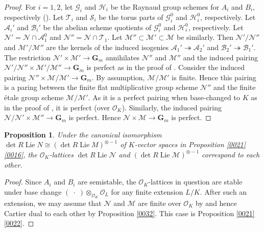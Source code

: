 \documentclass{amsart}
\newtheorem{proposition}[theorem]{Proposition}
\theoremstyle{remark}
\numberwithin{equation}{section}
\newcommand{\Order}{\mathcal{O}}
\newcommand{\onto}{\twoheadrightarrow}
\newcommand{\tensor}{\mathbin{\otimes}}
\newcommand{\Gm}{\mathbf{G}_{m}}
\newcommand{\var}{\;\cdot\;}
\DeclareMathOperator{\Lie}{Lie}
\begin{document}
\begin{proof}
	For $i = 1, 2$,
	let $\mathcal{G}_{i}$ and $\mathcal{H}_{i}$ be
	the Raynaud group schemes for $A_{i}$ and $B_{i}$, respectively
	(\cite[Chapter III, Theorem C.15]{Mil06}).
	Let $\mathcal{T}_{i}$ and $\mathcal{S}_{i}$ be
	the torus parts of
	$\mathcal{G}_{i}^{0}$ and $\mathcal{H}_{i}^{0}$, respectively.
	Let $\mathcal{A}_{i}'$ and $\mathcal{B}_{i}'$ be
	the abelian scheme quotients of
	$\mathcal{G}_{i}^{0}$ and $\mathcal{H}_{i}^{0}$, respectively.
	Let $\mathcal{N}' =  \mathcal{N} \cap \mathcal{A}_{1}^{0}$ and
	$\mathcal{N}'' = \mathcal{N} \cap \mathcal{T}_{1}$.
	Let $\mathcal{M}'' \subset \mathcal{M}' \subset \mathcal{M}$ be similarly.
	Then $\mathcal{N}' / \mathcal{N}''$ and $\mathcal{M}' / \mathcal{M}''$
	are the kernels of the induced isogenies
	$\mathcal{A}_{1}' \onto \mathcal{A}_{2}'$
	and $\mathcal{B}_{2}' \onto \mathcal{B}_{1}'$.
	The restriction $\mathcal{N}' \times \mathcal{M}' \to \Gm$
	annihilates $\mathcal{N}''$ and $\mathcal{M}''$
	and the induced pairing
	$\mathcal{N}' / \mathcal{N}'' \times \mathcal{M}' / \mathcal{M}'' \to \Gm$
	is perfect as in the proof of \cite[Chapter III, Theorem C.15 (d)]{Mil06}.
	Consider the induced pairing
	$\mathcal{N}'' \times \mathcal{M} / \mathcal{M}' \to \Gm$.
	By assumption, $\mathcal{M} / \mathcal{M}'$ is finite.
	Hence this pairing is a paring between
	the finite flat multiplicative group scheme $\mathcal{N}''$
	and the finite \'etale group scheme $\mathcal{M} / \mathcal{M}'$.
	As it is a perfect pairing when base-changed to $K$
	as in the proof of \cite[Chapter III, Theorem C.15 (d)]{Mil06},
	it is perfect (over $\Order_{K}$).
	Similarly, the induced pairing
	$\mathcal{N} / \mathcal{N}' \times \mathcal{M}'' \to \Gm$
	is perfect.
	Hence $\mathcal{N} \times \mathcal{M} \to \Gm$ is perfect.
\end{proof}

\begin{proposition} \label{0001}
	Under the canonical isomorphism
	$\det R \Lie N \cong (\det R \Lie M)^{\tensor -1}$
	of $K$-vector spaces in Proposition \ref{0021} \eqref{0016},
	the $\Order_{K}$-lattices
	$\det R \Lie \mathcal{N}$ and $(\det R \Lie \mathcal{M})^{\tensor -1}$
	correspond to each other.
\end{proposition}

\begin{proof}
	Since $A_{i}$ and $B_{i}$ are semistable,
	the $\Order_{K}$-lattices in question
	are stable under base change $(\var) \tensor_{\Order_{K}} \Order_{L}$
	for any finite extension $L / K$.
	After such an extension,
	we may assume that $\mathcal{N}$ and $\mathcal{M}$ are
	finite over $\Order_{K}$
	by \cite[Section 2.3, Lemma 6]{Ber03}
	and hence Cartier dual to each other by
	Proposition \ref{0032}.
	This case is Proposition \ref{0021} \eqref{0022}.
\end{proof}
\end{document}
